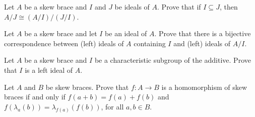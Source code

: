\begin{exercise}\label{ex:thmiso3}
    Let $A$ be a skew brace and $I$ and $J$ be ideals of $A$. Prove that if $I\subseteq J$, then $A/J\cong (A/I)/(J/I)$.
\end{exercise}

\begin{exercise}\label{ex:thmiso4}
    Let $A$ be a skew brace and let $I$ be an ideal of $A$. Prove that there is a bijective correspondence between (left) ideals of $A$ containing $I$ and (left) ideals of $A/I$.
\end{exercise}

\begin{exercise}
    Let $A$ be a skew brace and $I$ be a characteristic subgroup of the additive. Prove that $I$ is a left ideal of $A$.
\end{exercise}

\begin{exercise}
    Let $A$ and $B$ be skew braces. Prove that $f :A \to B$ is a homomorphism of skew braces if and only if $f(a+b)= f(a)+f(b)$ and $f(\lambda_a(b))=\lambda_{f(a)}(f(b))$, for all $a,b\in B$.
\end{exercise}
